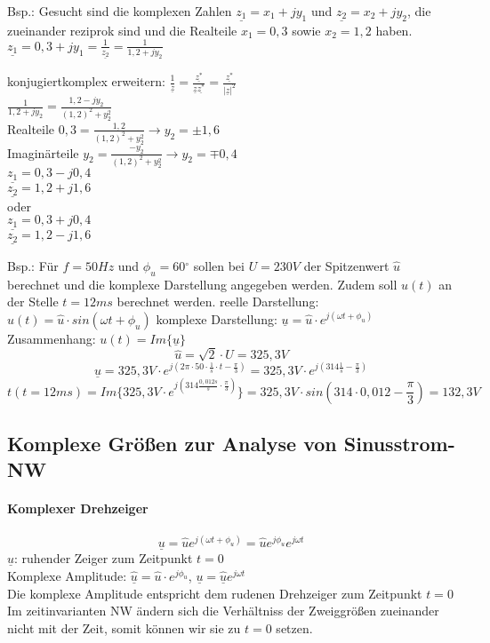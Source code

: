 \documentclass[german]{article}
\newcommand{\degree}{\ensuremath{^\circ}}
\begin{document}
Bsp.: Gesucht sind die komplexen Zahlen $\underline{z_1} = x_1 + jy_1$ und $\underline{z_2} = x_2 + jy_2$, die zueinander reziprok sind und die Realteile $x_1 = 0,3$ sowie $x_2 = 1,2$ haben.
$\underline{z_1} = 0,3 + jy_1 = \frac1{\underline{z_2}} = \frac1{1,2 + jy_2}$

konjugiertkomplex erweitern: $\frac1{\underline{z}} = \frac{\underline{z^*}}{\underline{z}\underline{z^*}} = \frac{\underline{z^*}}{|\underline{z}|^2}$ \\
$\frac1{1,2 + jy_2} = \frac{1,2 - jy_2}{(1,2)^2 + y_2^2}$ \\
Realteile $0,3 = \frac{1,2}{(1,2)^2 + y_2^2} \rightarrow y_2 = \pm 1,6$ \\
Imaginärteile $y_2 = \frac{-y_2}{(1,2)^2 + y_2^2} \rightarrow y_2 = \mp 0,4$ \\

$\underline{z_1} = 0,3 - j0,4$ \\
$\underline{z_2} = 1,2 + j1,6$ \\
oder \\
$\underline{z_1} = 0,3 + j0,4$ \\
$\underline{z_2} = 1,2 - j1,6$

Bsp.: Für $f = 50 Hz$ und $\phi_u = 60 \degree$ sollen bei $U = 230V$ der Spitzenwert $\hat{u}$ berechnet und die komplexe Darstellung angegeben werden. Zudem soll $u(t)$ an der Stelle $t = 12ms$ berechnet werden.
reelle Darstellung: $u(t) = \hat{u} \cdot sin(\omega t + \phi_u)$
komplexe Darstellung: $\underline{u} = \hat{u} \cdot e^{j(\omega t + \phi_u)}$
Zusammenhang: $u(t) = Im\{\underline{u}\}$
\[ \hat{u} = \sqrt{2} \cdot U = 325,3V \]
\[ \underline{u} = 325,3V \cdot e^{j(2\pi \cdot 50 \cdot \frac1s \cdot t - \frac{\pi}3)} = 325,3V \cdot e^{j(314 \frac1s - \frac{\pi}3)} \]
\[ t(t = 12ms) = Im\{ 325,3V \cdot e^{j(314 \frac{0,012s}{s} \cdot \frac{\pi}3)}\} = 325,3V \cdot sin(314 \cdot 0,012 - \frac{\pi}3) = 132,3V \]

\subsection{Komplexe Größen zur Analyse von Sinusstrom-NW}

\paragraph{Komplexer Drehzeiger}
\[ \underline{u} = \hat{u} e^{j(\omega t + \phi_u)} = \hat{u} e^{j\phi_u} e^{j\omega t} \]
$\underline{u}$: ruhender Zeiger zum Zeitpunkt $t=0$ \\
Komplexe Amplitude: $\underline{\hat{u}} = \hat{u} \cdot e^{j\phi_u}$, $\underline{u} = \underline{\hat{u}} e^{j\omega t}$ \\
Die komplexe Amplitude entspricht dem rudenen Drehzeiger zum Zeitpunkt $t=0$ \\
Im zeitinvarianten NW ändern sich die Verhältniss der Zweiggrößen zueinander nicht mit der Zeit, somit können wir sie zu $t=0$ setzen.
\end{document}
